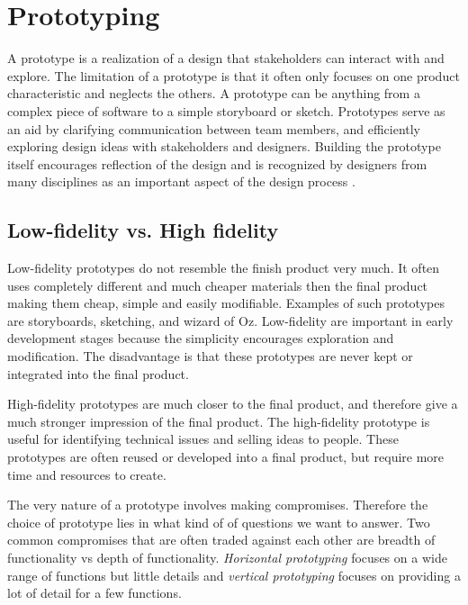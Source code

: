 \section{Prototyping}
A prototype is a realization of a design that stakeholders can interact with and explore. The limitation of a prototype is that it often only focuses on one product characteristic and neglects the others. A prototype can be anything from a complex piece of software to a simple storyboard or sketch. Prototypes serve as an aid by clarifying communication between team members, and efficiently exploring design ideas with stakeholders and designers. Building the prototype itself encourages reflection of the design and is recognized by designers from many disciplines as an important aspect of the design process \cite{interactionDesign}.

\subsection{Low-fidelity vs. High fidelity}
Low-fidelity prototypes do not resemble the finish product very much. It often uses completely different and much cheaper materials then the final product making them cheap, simple and easily modifiable. Examples of such prototypes are storyboards, sketching, and wizard of Oz. Low-fidelity are important in early development stages because the simplicity encourages exploration and modification. The disadvantage is that these prototypes are never kept or integrated into the final product.

High-fidelity prototypes are much closer to the final product, and therefore give a much stronger impression of the final product. The high-fidelity prototype is useful for identifying technical issues and selling ideas to people. These prototypes are often reused or developed into a final product, but require more time and resources to create.

The very nature of a prototype involves making compromises. Therefore the choice of prototype lies in what kind of of questions we want to answer. Two common compromises that are often traded against each other are breadth of functionality vs depth of functionality. \textit{Horizontal prototyping} focuses on a wide range of functions but little details and \textit{vertical prototyping} focuses on providing a lot of detail for a few functions. 

